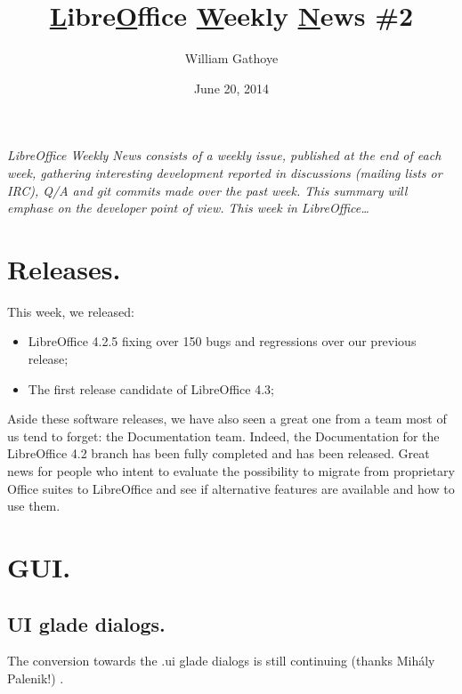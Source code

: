 \documentclass{article}
\begin{document}
\title{\underline{L}ibre\underline{O}ffice \underline{W}eekly \underline{N}ews \#2}
\author{William Gathoye}
\date{June 20, 2014}
\maketitle


\emph{LibreOffice Weekly News consists of a weekly issue, published at the end of
each week, gathering interesting development reported in discussions (mailing
lists or IRC), Q/A and git commits made over the past week. This summary will
emphase on the developer point of view.
This week in LibreOffice\ldots}

\tableofcontents



\section{Releases.}

This week, we released:

\begin{itemize}
    \item LibreOffice 4.2.5 fixing over 150 bugs and regressions over our previous release\cite{libo425};
    \item The first release candidate of LibreOffice 4.3\cite{libo43rc1};
\end{itemize}

Aside these software releases, we have also seen a great one from a team most of us tend to forget: the Documentation team. Indeed, the Documentation for the LibreOffice 4.2 branch has been fully completed and has been released\cite{doc42}. Great news for people who intent to evaluate the possibility to migrate from proprietary Office suites to LibreOffice and see if alternative features are available and how to use them.



\section{GUI.}

\subsection{UI glade dialogs.}

The conversion towards the .ui glade dialogs is still continuing (thanks Mihály Palenik!) \cite{gladeUi1,gladeUi2,gladeUi3,gladeUi4}.
\end{document}
